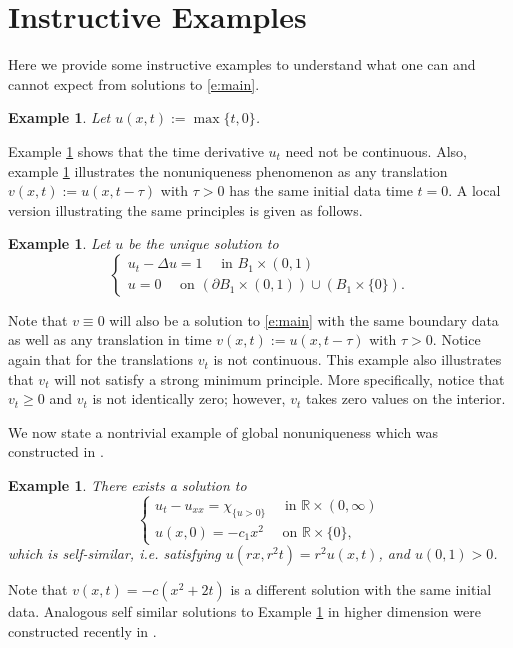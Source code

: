 \documentclass{amsart}
\newtheorem{example}[theorem]{Example}
\numberwithin{equation}{section}
\begin{document}
   
\section{Instructive Examples} \label{s:examples}
  Here we provide some instructive examples to understand what one can and cannot expect from solutions to \eqref{e:main}. 
  \begin{example} \label{ex:timeonly}
   Let $u(x,t):=\max\{t,0\}$. 
  \end{example}
  Example \ref{ex:timeonly} shows that the time derivative $u_t$ need not be continuous. Also, 
  example \ref{ex:timeonly} illustrates the nonuniqueness phenomenon as any translation $v(x,t):=u(x,t-\tau)$ with $\tau>0$ has the same initial data time $t=0$. A local version illustrating the same principles is given as follows.  
  \begin{example} \label{ex:local}
   Let $u$ be the unique solution to 
   \[
   \begin{cases}
       u_t - \Delta u=1 \quad \text{ in } B_1 \times (0,1) \\
       u=0 \quad \text{ on } (\partial B_1 \times (0,1))\cup(B_1 \times \{0\}). 
   \end{cases}
   \] 
  \end{example}
  Note that $v\equiv 0$ will also be a solution to \eqref{e:main} with the same boundary data as well as any translation in time $v(x,t):=u(x,t-\tau)$ with $\tau>0$. Notice again that for the translations $v_t$ is not continuous. This example also illustrates that $v_t$ will not satisfy a strong minimum principle. More specifically, notice that $v_t \geq 0$ and $v_t$ is not identically zero; however, $v_t$ takes zero values on the interior. 


  We now state a nontrivial example of global nonuniqueness which was constructed in \cite{gh92}. 
  \begin{example} \label{ex:selfsimilar}
     There exists a solution to 
     \[
     \begin{cases}
      u_t - u_{xx}=\chi_{\{u>0\}} \quad \text{ in } \mathbb{R} \times (0,\infty) \\
      u(x,0)=-c_1x^2 \quad \text{ on } \mathbb{R} \times \{0\}, 
      \end{cases}
     \]
     which is self-similar, i.e. satisfying $u(rx,r^2t)=r^2u(x,t)$, and $u(0,1)>0$.  
  \end{example}
  Note that $v(x,t)=-c(x^2+2t)$ is a different solution with the same initial data. Analogous self similar solutions to Example \ref{ex:selfsimilar} in higher dimension were constructed recently in \cite{fg24}. 
\end{document}
